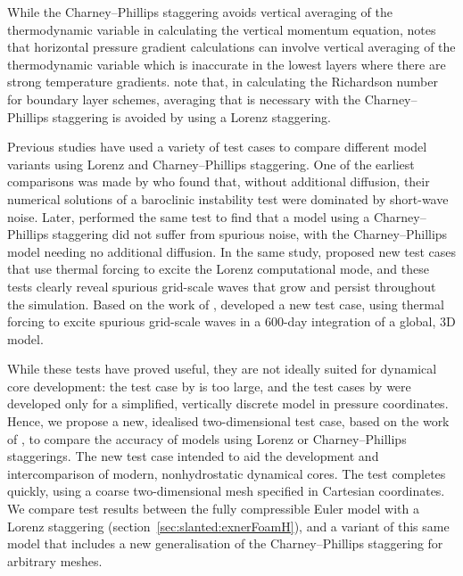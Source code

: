 While the Charney--Phillips staggering avoids vertical averaging of the thermodynamic variable in calculating the vertical momentum equation, \citet{davies2005} notes that horizontal pressure gradient calculations can involve vertical averaging of the thermodynamic variable which is inaccurate in the lowest layers where there are strong temperature gradients.
\citet{holdaway2013a} note that, in calculating the Richardson number for boundary layer schemes, averaging that is necessary with the Charney--Phillips staggering is avoided by using a Lorenz staggering.

Previous studies have used a variety of test cases to compare different model variants using Lorenz and Charney--Phillips staggering.
One of the earliest comparisons was made by \citet{arakawa-moorthi1988} who found that, without additional diffusion, their numerical solutions of a baroclinic instability test were dominated by short-wave noise.
Later, \citet{arakawa-konor1996} performed the same test to find that a model using a Charney--Phillips staggering did not suffer from spurious noise, with the Charney--Phillips model needing no additional diffusion.
In the same study, \citet{arakawa-konor1996} proposed new test cases that use thermal forcing to excite the Lorenz computational mode, and these tests clearly reveal spurious grid-scale waves that grow and persist throughout the simulation.
Based on the work of \citet{arakawa-konor1996}, \citet{untch-hortal2004} developed a new test case, using thermal forcing to excite spurious grid-scale waves in a 600-day integration of a global, 3D model.

While these tests have proved useful, they are not ideally suited for dynamical core development: the test case by \citet{untch-hortal2004} is too large, and the test cases by \citet{arakawa-konor1996} were developed only for a simplified, vertically discrete model in pressure coordinates.
Hence, we propose a new, idealised two-dimensional test case, based on the work of \citet{arakawa-konor1996}, to compare the accuracy of models using Lorenz or Charney--Phillips staggerings.
The new test case intended to aid the development and intercomparison of modern, nonhydrostatic dynamical cores.  The test completes quickly, using a coarse two-dimensional mesh specified in Cartesian coordinates.
We compare test results between the fully compressible Euler model with a Lorenz staggering (section~\ref{sec:slanted:exnerFoamH}), and a variant of this same model that includes a new generalisation of the Charney--Phillips staggering for arbitrary meshes.

